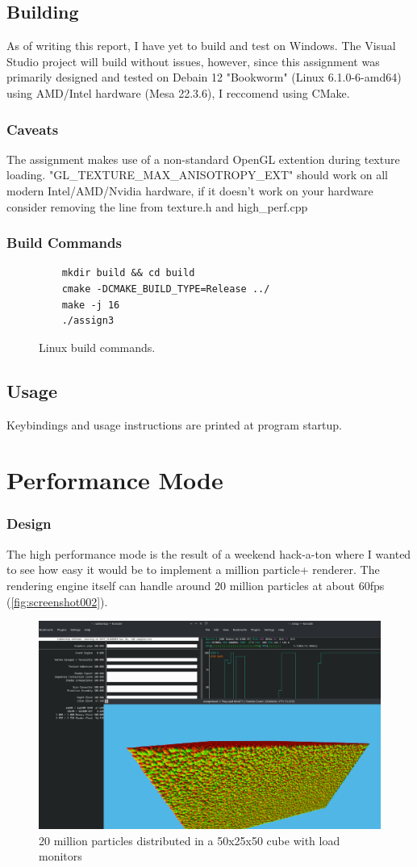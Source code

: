 \documentclass[]{report}
\begin{document}
\section{Building}
As of writing this report, I have yet to build and test on Windows. The Visual Studio project will build without issues, however, since this assignment was primarily designed and tested on Debain 12 "Bookworm" (Linux 6.1.0-6-amd64) using AMD/Intel hardware (Mesa 22.3.6), I reccomend using CMake. 
\subsection{Caveats}
The assignment makes use of a non-standard OpenGL extention during texture loading. "GL\_TEXTURE\_MAX\_ANISOTROPY\_EXT" should work on all modern Intel/AMD/Nvidia hardware, if it doesn't work on your hardware consider removing the line from texture.h and high\_perf.cpp
\subsection{Build Commands}
\begin{figure}[H]
	\centering
	\begin{lstlisting}
	mkdir build && cd build
	cmake -DCMAKE_BUILD_TYPE=Release ../
	make -j 16
	./assign3
	\end{lstlisting}
	\caption{Linux build commands.}
\end{figure}
\section{Usage}
Keybindings and usage instructions are printed at program startup.

\chapter{Performance Mode}\label{chap:hp}
\subsection{Design}
The high performance mode is the result of a weekend hack-a-ton where I wanted to see how easy it would be to implement a million particle+ renderer. The rendering engine itself can handle around 20 million particles at about 60fps (\autoref{fig:screenshot002}).

\begin{figure}[H]
	\centerline{\includegraphics[width=1.5\linewidth]{screenshot002}}
	\caption[]{20 million particles distributed in a 50x25x50 cube with load monitors}
	\label{fig:screenshot002}
\end{figure}
\end{document}
